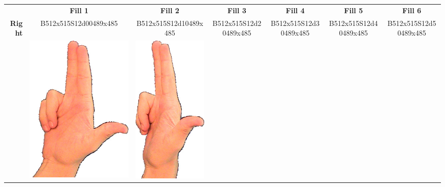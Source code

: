 \documentclass{article}
\begin{document}
\begin{center}
\begin{tabular}{r*{6}{c}}
&\textbf{Fill 1}&\textbf{Fill 2}&\textbf{Fill 3}&\textbf{Fill 4}&\textbf{Fill 5}&\textbf{Fill 6}\\
\multirow{2}{*}{\textbf{Right}}&
B512x515S12d00489x485&
B512x515S12d10489x485&
B512x515S12d20489x485&
B512x515S12d30489x485&
B512x515S12d40489x485&
B512x515S12d50489x485\\
&
\includegraphics[scale=0.1]{images/03-07-1.jpg}&
\includegraphics[scale=0.1]{images/03-07-2.jpg}&

\end{tabular}
\end{center}
\end{document}
